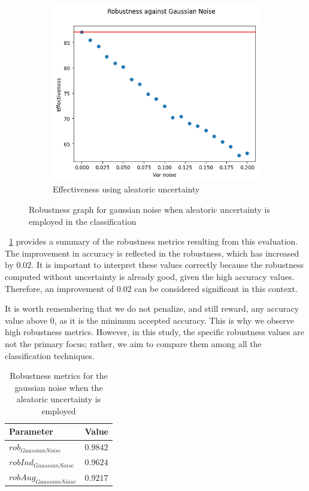 \begin{figure}[h]
\begin{subfigure}{.33\textwidth}
	\centering
	\includegraphics[width=0.9\linewidth]{ImageFiles/EvalBNN/GN/AU/eff}
	\caption{Effectiveness using aleatoric uncertainty}
	\label{fig:gn_au_eff}
	\end{subfigure}
	\caption{Robustness graph for gaussian noise when aleatoric uncertainty is employed in the classification}
	\label{fig:gn_au}
\end{figure}

\Tab~\ref{table:rob_gn_au} provides a summary of the robustness metrics resulting from this evaluation. The improvement in accuracy is reflected in the robustness, which has increased by $0.02$. It is important to interpret these values correctly because the robustness computed without uncertainty is already good, given the high accuracy values. Therefore, an improvement of $0.02$ can be considered significant in this context.

It is worth remembering that we do not penalize, and still reward, any accuracy value above $0$, as it is the minimum accepted accuracy. This is why we observe high robustness metrics. However, in this study, the specific robustness values are not the primary focus; rather, we aim to compare them among all the classification techniques.

\begin{table}[h]
	\centering
	\begin{tabular}{|| l | l ||} 
		\hline
		\textbf{Parameter} & \textbf{Value} \\
		\hline
		\hline
		$rob_{GaussianNoise}$ & $0.9842$ \\
		$robInd_{GaussianNoise}$ & $0.9624$ \\
		$robAug_{GaussianNoise}$ & $0.9217$ \\	
		\hline
	\end{tabular}	
	\caption{Robustness metrics for the gaussian noise when the aleatoric uncertainty is employed}
	\label{table:rob_gn_au}
\end{table}

